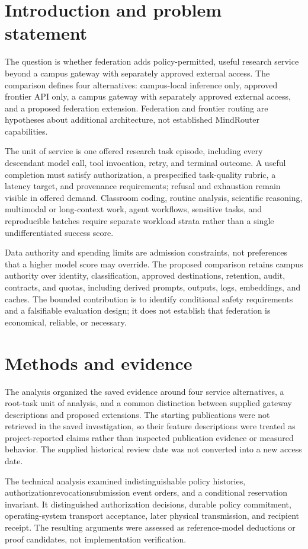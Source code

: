 \documentclass[11pt]{article}
\begin{document}
\section{Introduction and problem statement}
The question is whether federation adds policy-permitted, useful research service beyond a campus gateway with separately approved external access. The comparison defines four alternatives: campus-local inference only, approved frontier API only, a campus gateway with separately approved external access, and a proposed federation extension. Federation and frontier routing are hypotheses about additional architecture, not established MindRouter capabilities.

The unit of service is one offered research task episode, including every descendant model call, tool invocation, retry, and terminal outcome. A useful completion must satisfy authorization, a prespecified task-quality rubric, a latency target, and provenance requirements; refusal and exhaustion remain visible in offered demand. Classroom coding, routine analysis, scientific reasoning, multimodal or long-context work, agent workflows, sensitive tasks, and reproducible batches require separate workload strata rather than a single undifferentiated success score.

Data authority and spending limits are admission constraints, not preferences that a higher model score may override. The proposed comparison retains campus authority over identity, classification, approved destinations, retention, audit, contracts, and quotas, including derived prompts, outputs, logs, embeddings, and caches. The bounded contribution is to identify conditional safety requirements and a falsifiable evaluation design; it does not establish that federation is economical, reliable, or necessary.

\section{Methods and evidence}
The analysis organized the saved evidence around four service alternatives, a root-task unit of analysis, and a common distinction between supplied gateway descriptions and proposed extensions. The starting publications were not retrieved in the saved investigation, so their feature descriptions were treated as project-reported claims rather than inspected publication evidence or measured behavior. The supplied historical review date was not converted into a new access date.

The technical analysis examined indistinguishable policy histories, authorization\textendash{}\allowbreak{}revocation\textendash{}\allowbreak{}submission event orders, and a conditional reservation invariant. It distinguished authorization decisions, durable policy commitment, operating-system transport acceptance, later physical transmission, and recipient receipt. The resulting arguments were assessed as reference-model deductions or proof candidates, not implementation verification.
\end{document}
